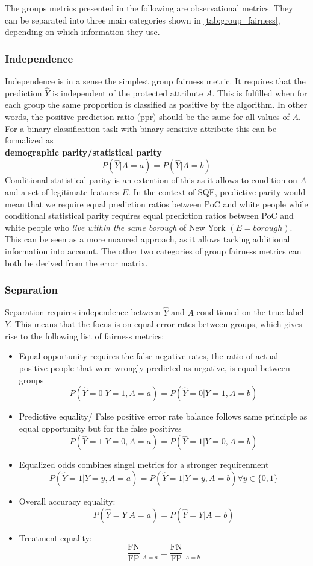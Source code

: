 The groups metrics presented in the following are observational metrics. They can be separated into three main categories shown in \autoref{tab:group_fairness}, depending on which information they use.

\subsubsection*{Independence}
Independence is in a sense the simplest group fairness metric. It requires that the prediction $\hat{Y}$ is independent of the protected attribute $A$. This is fulfilled when for each group the same proportion is classified as positive by the algorithm. In other words, the positive prediction ratio (ppr) should be the same for all values of $A$. For a binary classification task with binary sensitive attribute this can be formalized as \\
\textbf{demographic parity/statistical parity}
$$P(\hat{Y} | A = a) = P(\hat{Y} | A = b)$$
Conditional statistical parity is an extention of this as it allows to condition on $A$ and a set of legitimate features $E$. In the context of SQF, predictive parity would mean that we require equal prediction ratios between PoC and white people while conditional statistical parity requires equal prediction ratios between PoC and white people who \textit{live within the same borough} of New York $(E = borough)$. This can be seen as a more nuanced approach, as it allows tacking additional information into account.
The other two categories of group fairness metrics can both be derived from the error matrix.

\subsubsection*{Separation}
Separation requires independence between $\hat{Y}$ and $A$ conditioned on the true label $Y$. This means that the focus is on equal error rates between groups, which gives rise to the following list of fairness metrics:
\begin{itemize}
    \item Equal opportunity requires the false negative rates, the ratio of actual positive people that were wrongly predicted as negative, is equal between groups $$P(\hat{Y} = 0 | Y = 1, A = a) = P(\hat{Y} = 0 | Y = 1, A = b)$$
    \item Predictive equality/ False positive error rate balance follows same principle as equal opportunity but for the false positives $$P(\hat{Y} = 1 | Y = 0, A = a) = P(\hat{Y} = 1 | Y = 0, A = b)$$
    \item Equalized odds combines singel metrics for a stronger requirenment $$P(\hat{Y} = 1 | Y = y, A = a) = P(\hat{Y} = 1 | Y = y, A = b) \forall y \in \{0, 1\}$$ 
    \item Overall accuracy equality: $$P(\hat{Y} = Y | A = a) = P(\hat{Y} = Y | A = b)$$ 
    \item Treatment equality: $$\frac{\text{FN}}{\text{FP}} \big|_{A = a} = \frac{\text{FN}}{\text{FP}} \big|_{A = b}$$
\end{itemize}

